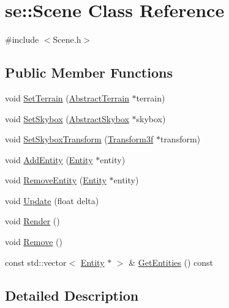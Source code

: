 \hypertarget{classse_1_1_scene}{}\section{se\+:\+:Scene Class Reference}
\label{classse_1_1_scene}


{\ttfamily \#include $<$Scene.\+h$>$}

\subsection*{Public Member Functions}
\begin{DoxyCompactItemize}
\item 
void \mbox{\hyperlink{classse_1_1_scene_ac8fddc56bc7f1385d640f24e75ea41d6}{Set\+Terrain}} (\mbox{\hyperlink{classse_1_1_abstract_terrain}{Abstract\+Terrain}} $\ast$terrain)
\item 
void \mbox{\hyperlink{classse_1_1_scene_a3e6547c6013dc83a23d6cc0f349955f0}{Set\+Skybox}} (\mbox{\hyperlink{classse_1_1_abstract_skybox}{Abstract\+Skybox}} $\ast$skybox)
\item 
void \mbox{\hyperlink{classse_1_1_scene_a75e3a3401c9d999f43baf01e89b16735}{Set\+Skybox\+Transform}} (\mbox{\hyperlink{classse_1_1_transform3f}{Transform3f}} $\ast$transform)
\item 
void \mbox{\hyperlink{classse_1_1_scene_a21dde7d731d672d4c424397850864549}{Add\+Entity}} (\mbox{\hyperlink{classse_1_1_entity}{Entity}} $\ast$entity)
\item 
void \mbox{\hyperlink{classse_1_1_scene_a5803cfd0f0dccf350f7a3fe478b3c834}{Remove\+Entity}} (\mbox{\hyperlink{classse_1_1_entity}{Entity}} $\ast$entity)
\item 
void \mbox{\hyperlink{classse_1_1_scene_acdc3858f5d4fd76cf9a712a02218341a}{Update}} (float delta)
\item 
void \mbox{\hyperlink{classse_1_1_scene_a6631ed2e0cc029636464dbaf76d55cbf}{Render}} ()
\item 
void \mbox{\hyperlink{classse_1_1_scene_a73f7789f2585e65174380be509b88435}{Remove}} ()
\item 
const std\+::vector$<$ \mbox{\hyperlink{classse_1_1_entity}{Entity}} $\ast$ $>$ \& \mbox{\hyperlink{classse_1_1_scene_a1c3f1fc4ab110f9caab190cce13c2e03}{Get\+Entities}} () const
\end{DoxyCompactItemize}


\subsection{Detailed Description}


